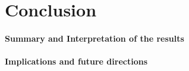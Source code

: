 
\section{Conclusion}
\label{sec:conclusion}

\paragraph{Summary and Interpretation of the results}

\paragraph{Implications and future directions}
